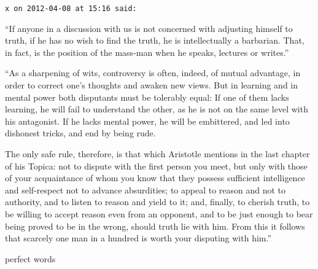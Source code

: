 \begin{footnotesize}
\begin{sffamily}
\texttt{x on 2012-04-08 at 15:16 said:}

``If anyone in a discussion with us is not concerned with adjusting himself to truth, if he has no wish to find the truth, he is intellectually a barbarian. That, in fact, is the position of the mass-man when he speaks, lectures or writes.''

``As a sharpening of wits, controversy is often, indeed, of mutual advantage, in order to correct one's thoughts and awaken new views. But in learning and in mental power both disputants must be tolerably equal: If one of them lacks learning, he will fail to understand the other, as he is not on the same level with his antagonist. If he lacks mental power, he will be embittered, and led into dishonest tricks, and end by being rude.

The only safe rule, therefore, is that which Aristotle mentions in the last chapter of his Topica: not to dispute with the first person you meet, but only with those of your acquaintance of whom you know that they possess sufficient intelligence and self-respect not to advance absurdities; to appeal to reason and not to authority, and to listen to reason and yield to it; and, finally, to cherish truth, to be willing to accept reason even from an opponent, and to be just enough to bear being proved to be in the wrong, should truth lie with him. From this it follows that scarcely one man in a hundred is worth your disputing with him.''

perfect words


\hfill

\end{sffamily}
\end{footnotesize}

